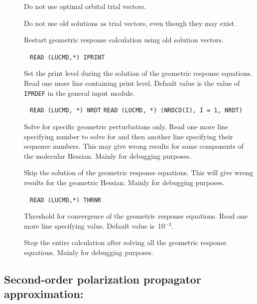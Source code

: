 \begin{description}
\item[] Do not use optimal orbital
trial vectors.

\item[] Do not use old solutions as trial vectors, even
though they may exist.

\item[] Restart geometric response calculation using old
solution vectors.

\item[]\verb| |\newline
\verb|READ (LUCMD,*) IPRINT|

Set the print level during the solution of the geometric response
equations.  Read one more line containing print level. Default
value is the value of \verb|IPRDEF| in the general input module.

\item[]\verb| |\newline
\verb|READ (LUCMD, *) NRDT|\newline
\verb|READ (LUCMD, *) (NRDCO(I), I = 1, NRDT)|

Solve for specific geometric perturbations only.  Read
one more line specifying number to solve for and then another
line specifying their sequence numbers. This may give wrong results
for some components of the molecular Hessian. Mainly for debugging
purposes.

\item[] Skip the solution of the geometric response
equations. This will give wrong results for the geometric Hessian.
Mainly for debugging purposes.

\item[]\verb| |\newline
\verb|READ (LUCMD,*) THRNR|

Threshold for convergence of the geometric response
equations.  Read one more line specifying value.  Default
value is~10$^{-3}$.

\item[] Stop the entire calculation after solving all
the geometric  response equations. Mainly for debugging purposes.
\end{description}

\subsection{Second-order polarization propagator approximation:
}\label{sec:soppa}

